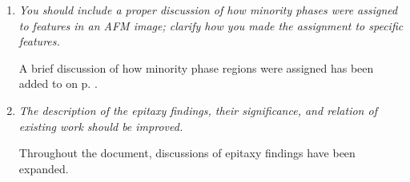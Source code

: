 \documentclass[12pt,%
               letterpaper,
               oneside]{uiothesis}
\begin{document}
\begin{enum}
\begin{enumerate}[label=\alph*,leftmargin=1em]
  \item \emph{You should include a proper discussion of how minority phases were assigned to features in an AFM image; clarify how you made the assignment to specific features.}\vspace{8pt}
  
  A brief discussion of how minority phase regions were assigned has been added to  on p. \pageref{minorityphase}.\vspace{16pt} 
  
  \item \emph{The description of the epitaxy findings, their significance, and relation of existing work should be improved.}\vspace{8pt}
  
  Throughout the document, discussions of epitaxy findings have been expanded.
  
  \vspace{16pt}
  
\end{enumerate}
  
\end{enum}
\end{document}
